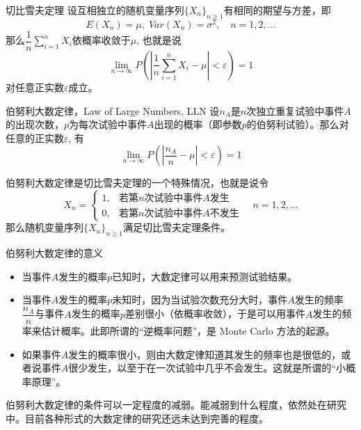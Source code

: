 \begin{frame}

\begin{block}{切比雪夫定理}
设互相独立的随机变量序列$\{X_n\}_{n\ge1}$有相同的期望与方差，即
$$E(X_n) = \mu, \; Var(X_n) = \sigma^2, \quad n=1,2,\ldots$$
那么$\dfrac{1}{n}\sum\limits_{i=1}^n X_i$依概率收敛于$\mu$, 也就是说
$$\lim\limits_{n\to\infty} P\left( \left\vert \dfrac{1}{n}\sum\limits_{i=1}^n X_i - \mu \right\vert < \varepsilon \right) = 1$$
对任意正实数$\varepsilon$成立。
\end{block}

\end{frame}


\begin{frame}

\begin{block}{伯努利大数定律，Law of Large Numbers, LLN}
设$n_A$是$n$次独立重复试验中事件$A$的出现次数，$p$为每次试验中事件$A$出现的概率（即参数$p$的伯努利试验）。那么对任意的正实数$\varepsilon$, 有
$$\lim\limits_{n\to\infty} P\left( \left\vert \dfrac{n_A}{n} - \mu \right\vert < \varepsilon \right) = 1$$
\end{block}

\vspace{1em}
\pause

伯努利大数定律是切比雪夫定理的一个特殊情况，也就是说令
$$X_n = \begin{cases}
1, & \text{若第$n$次试验中事件$A$发生} \\
0, & \text{若第$n$次试验中事件$A$不发生} 
\end{cases} \quad n=1,2,\ldots$$
那么随机变量序列$\{X_n\}_{n\ge1}$满足切比雪夫定理条件。
\end{frame}


\begin{frame}

\begin{block}{伯努利大数定律的意义}
\begin{itemize}
\item 当事件$A$发生的概率$p$已知时，大数定律可以用来预测试验结果。
\item 当事件$A$发生的概率$p$未知时，因为当试验次数充分大时，事件$A$发生的频率$\dfrac{n_A}{n}$与事件$A$发生的概率$p$差别很小（依概率收敛），于是可以用事件$A$发生的频率来估计概率。此即所谓的``逆概率问题''，是 Monte Carlo 方法的起源。
\item 如果事件$A$发生的概率很小，则由大数定律知道其发生的频率也是很低的，或者说事件$A$很少发生，以至于在一次试验中几乎不会发生。这就是所谓的``小概率原理''。
\end{itemize}
\end{block}

\vspace{1em}
\pause

伯努利大数定律的条件可以一定程度的减弱。能减弱到什么程度，依然处在研究中。目前各种形式的大数定律的研究还远未达到完善的程度。

\end{frame}

